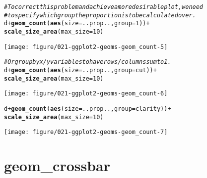 \documentclass[a4paper,titlepage]{tufte-handout}\usepackage[]{graphicx}\usepackage[]{color}
\makeatletter
\def\maxwidth{ %
  \ifdim\Gin@nat@width>\linewidth
    \linewidth
  \else
    \Gin@nat@width
  \fi
}
\newcommand{\hlnum}[1]{\textcolor[rgb]{0.686,0.059,0.569}{#1}}%
\newcommand{\hlcom}[1]{\textcolor[rgb]{0.678,0.584,0.686}{\textit{#1}}}%
\newcommand{\hlopt}[1]{\textcolor[rgb]{0,0,0}{#1}}%
\newcommand{\hlstd}[1]{\textcolor[rgb]{0.345,0.345,0.345}{#1}}%
\newcommand{\hlkwc}[1]{\textcolor[rgb]{0.333,0.667,0.333}{#1}}%
\newcommand{\hlkwd}[1]{\textcolor[rgb]{0.737,0.353,0.396}{\textbf{#1}}}%
\newenvironment{kframe}{%
 \def\at@end@of@kframe{}%
 \ifinner\ifhmode%
  \def\at@end@of@kframe{\end{minipage}}%
  \begin{minipage}{\columnwidth}%
 \fi\fi%
 \def\FrameCommand##1{\hskip\@totalleftmargin \hskip-\fboxsep
 \colorbox{shadecolor}{##1}\hskip-\fboxsep
     \hskip-\linewidth \hskip-\@totalleftmargin \hskip\columnwidth}%
 \MakeFramed {\advance\hsize-\width
   \@totalleftmargin\z@ \linewidth\hsize
   \@setminipage}}%
 {\par\unskip\endMakeFramed%
 \at@end@of@kframe}
\newenvironment{knitrout}{}{} %
\makeatother
\begin{document}
\begin{knitrout}
\begin{kframe}
\begin{alltt}
\hlcom{# To correct this problem and achieve a more desirable plot, we need}
\hlcom{# to specify which group the proportion is to be calculated over.}
\hlstd{d} \hlopt{+} \hlkwd{geom_count}\hlstd{(}\hlkwd{aes}\hlstd{(}\hlkwc{size} \hlstd{= ..prop..,} \hlkwc{group} \hlstd{=} \hlnum{1}\hlstd{))} \hlopt{+}
  \hlkwd{scale_size_area}\hlstd{(}\hlkwc{max_size} \hlstd{=} \hlnum{10}\hlstd{)}
\end{alltt}
\end{kframe}
\texttt{[image: figure/021-ggplot2-geoms-geom\_count-5]} 
\begin{kframe}\begin{alltt}
\hlcom{# Or group by x/y variables to have rows/columns sum to 1.}
\hlstd{d} \hlopt{+} \hlkwd{geom_count}\hlstd{(}\hlkwd{aes}\hlstd{(}\hlkwc{size} \hlstd{= ..prop..,} \hlkwc{group} \hlstd{= cut))} \hlopt{+}
  \hlkwd{scale_size_area}\hlstd{(}\hlkwc{max_size} \hlstd{=} \hlnum{10}\hlstd{)}
\end{alltt}
\end{kframe}
\texttt{[image: figure/021-ggplot2-geoms-geom\_count-6]} 
\begin{kframe}\begin{alltt}
\hlstd{d} \hlopt{+} \hlkwd{geom_count}\hlstd{(}\hlkwd{aes}\hlstd{(}\hlkwc{size} \hlstd{= ..prop..,} \hlkwc{group} \hlstd{= clarity))} \hlopt{+}
  \hlkwd{scale_size_area}\hlstd{(}\hlkwc{max_size} \hlstd{=} \hlnum{10}\hlstd{)}
\end{alltt}
\end{kframe}
\texttt{[image: figure/021-ggplot2-geoms-geom\_count-7]} 

\end{knitrout}


\section{geom\_crossbar}
\end{document}
